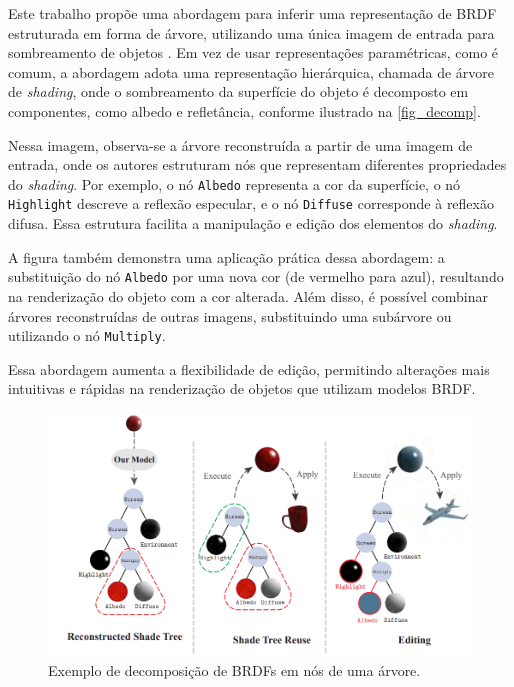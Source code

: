 Este trabalho propõe uma abordagem para inferir uma representação de BRDF  estruturada em forma de árvore, utilizando uma única imagem de entrada para sombreamento de objetos \cite{tree_decomposition}. Em vez de usar representações paramétricas, como é comum, a abordagem adota uma representação hierárquica, chamada de árvore de \textit{shading}, onde o sombreamento da superfície do objeto é decomposto em componentes, como albedo e refletância, conforme ilustrado na \autoref{fig_decomp}.

Nessa imagem, observa-se a árvore reconstruída a partir de uma imagem de entrada, onde os autores estruturam nós que representam diferentes propriedades do \textit{shading}. Por exemplo, o nó \texttt{Albedo} representa a cor da superfície, o nó \texttt{Highlight} descreve a reflexão especular, e o nó \texttt{Diffuse} corresponde à reflexão difusa. Essa estrutura facilita a manipulação e edição dos elementos do \textit{shading}.

A figura também demonstra uma aplicação prática dessa abordagem: a substituição do nó \texttt{Albedo} por uma nova cor (de vermelho para azul), resultando na renderização do objeto com a cor alterada. Além disso, é possível combinar árvores reconstruídas de outras imagens, substituindo uma subárvore ou utilizando o nó \texttt{Multiply}.

Essa abordagem aumenta a flexibilidade de edição, permitindo alterações mais intuitivas e rápidas na renderização de objetos que utilizam modelos BRDF.

\begin{figure}[H]
        \caption{\label{fig_decomp} \small Exemplo de decomposição de BRDFs em nós de uma árvore.}
        \begin{center}
            \includegraphics[scale=0.5]{./Imagens/tree-shading.png}
        \end{center}
\end{figure}




